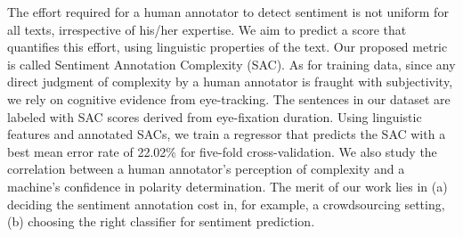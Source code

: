 The effort required for a human annotator to detect sentiment is not uniform for all texts, irrespective of his/her expertise. We aim to predict a score that quantifies this effort, using linguistic properties of the text. Our proposed metric is called Sentiment Annotation Complexity (SAC). As for training data, since any direct judgment of complexity by a human annotator is fraught with subjectivity, we rely on cognitive evidence from eye-tracking. The sentences in our dataset are labeled with SAC scores derived from eye-fixation duration. Using linguistic features and annotated SACs, we train a regressor that predicts the SAC with a best mean error rate of 22.02\% for five-fold cross-validation. We also study the correlation between a human annotator's perception of complexity and a machine's confidence in polarity determination. The merit of our work lies in (a) deciding the sentiment annotation cost in, for example, a crowdsourcing setting,(b) choosing the right classifier for sentiment prediction.
